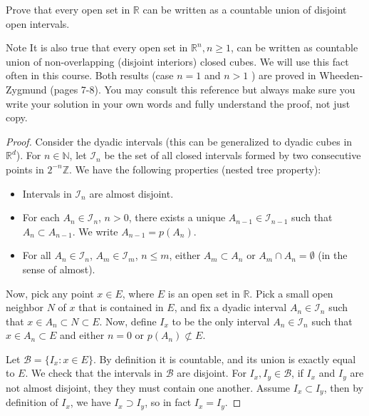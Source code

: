 
\begin{problem}
	Prove that every open set in $\mathbb{R}$ can be written as a countable union of disjoint open intervals.

Note It is also true that every open set in $\mathbb{R}^n, n \geq 1$, can be written as countable union of non-overlapping (disjoint interiors) closed cubes. We will use this fact often in this course. Both results (case $n=1$ and $n>1$ ) are proved in Wheeden-Zygmund (pages 7-8). You may consult this reference but always make sure you write your solution in your own words and fully understand the proof, not just copy.
\end{problem}
\begin{proof}
	Consider the dyadic intervals (this can be generalized to dyadic cubes in $\mathbb{R}^d$). For $n \in \mathbb{N}$, let $\mathcal{I}_n$ be the set of all closed intervals formed by two consecutive points in $2^{-n} \mathbb{Z}$. We have the following properties (nested tree property):
	\begin{itemize}
		\item Intervals in $\mathcal{I}_n$ are almost disjoint.
		\item For each $A_n \in \mathcal{I}_n$, $n > 0$, there exists a unique $A_{n-1} \in \mathcal{I}_{n-1}$ such that $A_n \subset A_{n-1}$. We write $A_{n - 1} = p(A_n)$.
		\item For all $A_n \in \mathcal{I}_n$, $A_m \in \mathcal{I}_m$, $n \le m$, either $A_m \subset A_n$ or $A_m \cap A_n = \emptyset $ (in the sense of almost).
	\end{itemize}

	Now, pick any point $ x \in E$, where $E$ is an open set in $\mathbb{R}$. Pick a small open neighbor $N$ of $x$ that is contained in $E$, and fix a dyadic interval $A_n \in \mathcal{I}_n$ such that $ x \in A_n \subset N \subset E$. Now, define
	$I_x$ to be the only interval  $A_n \in \mathcal{I}_n$ such that $x \in A_n \subset E$ and either $n = 0$ or $p(A_n) \not \subset E$.

	Let $\mathcal{B} = \{I_x: x \in E\} $. By definition it is countable, and its union is exactly equal to $E$. We check that the intervals in $\mathcal{B}$ are disjoint. For $I_x, I_y \in \mathcal{B}$, if $I_x$ and $I_y$ are not almost disjoint, they they must contain one another. Assume $I_x \subset I_y$, then by definition of $I_x$, we have $I_x \supset I_y$, so in fact $I_x = I_y$.
\end{proof}

